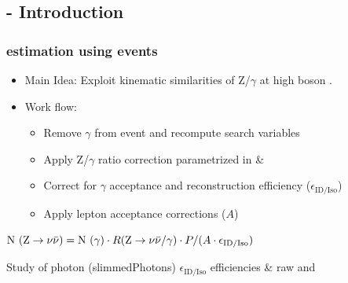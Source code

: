 \documentclass{beamer}
\begin{document}
\subsection{\photonJets - Introduction}
\begin{frame}
\frametitle{\ZInv estimation using \photonJets events}
\begin{itemize}
 \item Main Idea: Exploit kinematic similarities of Z/$\gamma$ at high boson \pt.
 \item Work flow:
 \begin{itemize}
  \item Remove $\gamma$ from event and recompute search variables
  \item Apply Z/$\gamma$ ratio correction parametrized in \MHT \& \NJets
  \item Correct for $\gamma$ acceptance and reconstruction efficiency ($\epsilon_{\text{ID/Iso}}$)
  \item Apply lepton acceptance corrections ($A$)
 \end{itemize}
\end{itemize}
  \begin{center}
  $\text{N }(\text{Z}\rightarrow\nu\bar{\nu}) = \text{N }(\gamma)\cdot R(\text{Z}\rightarrow\nu\bar{\nu}/\gamma)\cdot P/ (A\cdot \epsilon_{\text{ID/Iso}})$
  \end{center}
\begin{block}{}
\centering
Study of photon (slimmedPhotons) $\epsilon_{\text{ID/Iso}}$ efficiencies \& raw \HT and \MHT
\end{block}

\end{frame}
\end{document}
